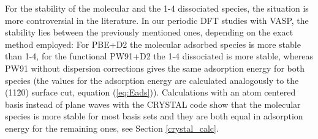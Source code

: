 \documentclass[11pt,DIV=13,BCOR=5mm,a4paper,headinclude]{scrbook}
\begin{document}
For the stability of the molecular and the 1-4 dissociated species, the situation is more controversial in the literature\cite{WirthJPCC2012,hass00,Ranea2009}.
In our periodic DFT studies with VASP, the stability lies between the previously mentioned ones, depending on the exact method employed: For PBE+D2 the molecular adsorbed species is more stable than 1-4, for the functional PW91+D2 the 1-4 dissociated is more stable, whereas PW91 without dispersion corrections gives the same adsorption energy for both species (the values for the adsorption energy are calculated analogously to the (11\=20) surface cut, equation (\ref{eq:Eads})).
Calculations with an atom centered basis instead of plane waves with the CRYSTAL code show that the molecular species is more stable for most basis sets and they are both equal in adsorption energy for the remaining ones, see Section \ref{crystal_calc}.
\end{document}
